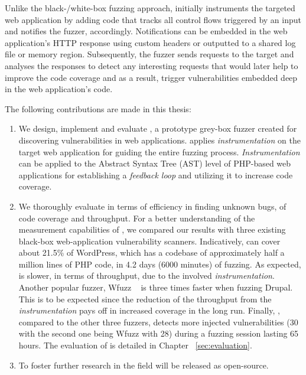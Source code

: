 Unlike the black-/white-box fuzzing approach, \pname{} initially instruments the targeted web application by adding code that tracks all control flows triggered by an input and notifies the fuzzer, accordingly. Notifications can be embedded in the web application's HTTP response using custom headers or outputted to a shared log file or memory region. Subsequently, the fuzzer sends requests to the target and analyses the responses to detect any interesting requests that would later help to improve the code coverage and as a result, trigger vulnerabilities embedded deep in the web application's code.

The following contributions are made in this thesis:

\begin{enumerate}

\item We design, implement and evaluate \pname{}, a prototype grey-box fuzzer created for discovering vulnerabilities in web applications. \pname{} applies \emph{instrumentation} on the target web application for guiding the entire fuzzing process. \emph{Instrumentation} can be applied to the Abstract Syntax Tree (AST) level of PHP-based web applications for establishing a \emph{feedback loop} and utilizing it to increase code coverage.
\item We thoroughly evaluate \pname{} in terms of efficiency in finding unknown bugs, of code coverage and throughput. For a better understanding of the measurement capabilities of \pname{}, we compared our results with three existing black-box web-application vulnerability scanners. Indicatively, \pname{} can cover about 21.5\% of WordPress, which has a codebase of approximately half a million lines of PHP code, in 4.2 days (6000 minutes) of fuzzing. As expected, \pname{} is slower, in terms of throughput, due to the involved \emph{instrumentation}. Another popular fuzzer, Wfuzz ~\cite{wfuzz} is three times faster when fuzzing Drupal. This is to be expected since the reduction of the throughput from the \emph{instrumentation} pays off in increased coverage in the long run. Finally, \pname{}, compared to the other three fuzzers, detects more injected vulnerabilities (30 with the second one being Wfuzz with 28) during a fuzzing session lasting 65 hours. The evaluation of \pname{} is detailed in Chapter ~\ref{sec:evaluation}.
\item To foster further research in the field \pname{} will be released as open-source.

\end{enumerate}

